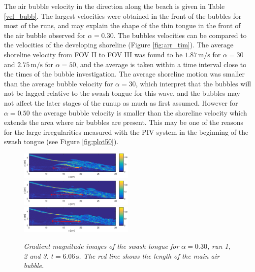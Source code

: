 \documentclass[review, authoryear]{elsarticle}
\newcommand{\s}{\,\mbox{s}}
\newcommand{\mps}{\,\mbox{m/s}}
\begin{document}
The air bubble velocity in the direction along the beach is given in Table \ref{vel_bubb}. The largest velocities were obtained in the front of the bubbles for most of the runs, and may explain the shape of the thin tongue in the front of the air bubble observed for $\alpha=0.30$. The bubbles velocities can be compared to the velocities of the developing shoreline (Figure \ref{fig:arr_tim}). The average shoreline velocity from  FOV II to FOV III was found to be $1.87\mps$ for $\alpha=30$ and $2.75\mps$ for $\alpha=50$, and the average is taken within a time interval close to the times of the bubble investigation. The average shoreline motion was smaller than the average bubble velocity for $\alpha=30$, which interpret that the bubbles will not be lagged relative to the swash tongue for this wave, and the bubbles may not affect the later stages of the runup as much as first assumed. However for $\alpha=0.50$ the average bubble velocity is smaller than the shoreline velocity which extends the area where air bubbles are present. This may be one of the reasons for the large irregularities measured with the PIV system in the beginning of the swash tongue (see Figure \ref{fig:plot50}).
\begin{figure}[]
\centering
\includegraphics[angle=5.1,width=0.5\textwidth]{./Figures/BUBBLE/bubble30_run1_r.eps}
\includegraphics[angle=5.1,width=0.5\textwidth]{./Figures/BUBBLE/bubble30_run2_r.eps}
\includegraphics[angle=5.1,width=0.5\textwidth]{./Figures/BUBBLE/bubble30_run3_r.eps}
\caption{\textit{Gradient magnitude images of the swash tongue for $\alpha=0.30$, run 1, 2 and 3. $t=6.06\s$. The red line shows the length of the main air bubble}.}
\label{fig:bubble_30}
\end{figure}
\end{document}
